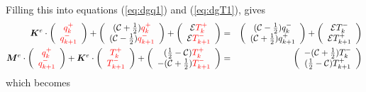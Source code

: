 \noindent
Filling this into equations (\ref{eq:dgq1}) and (\ref{eq:dgT1}), gives 
\begin{eqnarray}
{\bm K}^e \cdot 
\left( 
\begin{array}{cc}
    {\color{red}q_k^+}  \\
    {\color{red}q_{k+1}^-}
\end{array}
\right)+ 
\left(
\begin{array}{cc}
     ({\cal C}+\frac{1}{2})  {\color{red}q_k^+}  \\
     ({\cal C}-\frac{1}{2})  {\color{red}q_{k+1}^-} 
\end{array}
\right)+\left(
\begin{array}{cc}
     {\cal E}    {\color{red}T_k^+}  \\
     {\cal E}    {\color{red}T_{k+1}^-} 
\end{array}
\right) 
&=& 
\left(
\begin{array}{cc}
     ({\cal C}-\frac{1}{2}) q_k^-  \\
     ({\cal C}+\frac{1}{2}) q_{k+1}^+ 
\end{array}
\right)
+ \left(
\begin{array}{cc}
     {\cal E}   T_k^-  \\
     {\cal E}   T_{k+1}^+
\end{array}
\right)  
\nonumber
\\
{\bm M}^e \cdot
\left(
\begin{array}{cc}
    {\color{red}q_k^+}  \\
    {\color{red}q_{k+1}^-}
\end{array}
\right)+
{\bm K}^e \cdot
\left(
\begin{array}{cc}
 {\color{red}T_k^+}  \\
{\color{red}T_{k+1}^-} 
\end{array}
\right) 
+ \left(
\begin{array}{cc}
     (\frac{1}{2}-{\cal C}) {\color{red}T_k^+}  \\
     -({\cal C}+\frac{1}{2}){\color{red}T_{k+1}^-} 
\end{array}
\right)
&=& \left(
\begin{array}{cc}
     -({\cal C}+\frac{1}{2})  T_k^- \\
     (\frac{1}{2}-{\cal C})  T_{k+1}^+ 
\end{array}
\right) 
\end{eqnarray}
which becomes
